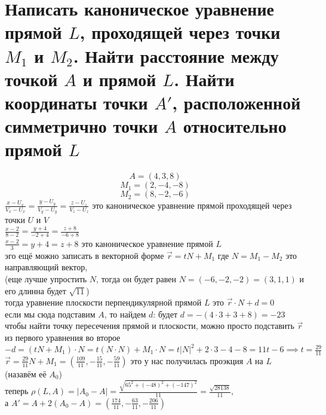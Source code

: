 \documentclass{article}
\renewcommand{\vec}{\overrightarrow}
\newcommand{\ds}{\displaystyle}
\newcommand{\abs}[1]{\left|#1\right|}
\begin{document}
  \section{Написать каноническое уравнение прямой $L$, проходящей через точки $M_1$ и $M_2$. Найти расстояние между точкой $A$ и прямой $L$. Найти координаты точки $A'$, расположенной симметрично точки $A$ относительно прямой $L$}
  $$ A = (4, 3, 8) $$
  $$ M_1 = (2, -4, -8) $$
  $$ M_2 = (8, -2, -6) $$
  $\ds \frac{x-U_x}{V_x-U_x} = \frac{y-U_y}{V_y-U_y} = \frac{z-U_z}{V_z-U_z}$ это каноническое уравнение прямой проходящей через точки $U$ и $V$ \\
  $\ds \frac{x-2}{8-2} = \frac{y+4}{-2+4} = \frac{z+8}{-6+8}$ \\
  $\ds \frac{x-2}{3} = y+4 = z+8$ это каноническое уравнение прямой $L$ \\
  эго ещё можно записать в векторной форме $\ds \vec{r} = tN + M_1$ где $N = M_1-M_2$ это направляющий вектор, \\
  (еще лучше упростить $N$, тогда он будет равен $N = (-6, -2, -2) = (3, 1, 1)$ и его длинна будет $\sqrt{11}$) \\
  тогда уравнение плоскости перпендикулярной прямой $L$ это $\ds \vec{r} \cdot N + d = 0$ \\
  если мы сюда подставим $A$, то найдем $d$: будет $d = -(4 \cdot 3 + 3 + 8) = -23$ \\
  чтобы найти точку пересечения прямой и плоскости, можно просто подставить $\vec{r}$ из первого уравнения во второе \\
  $\ds -d = (tN + M_1) \cdot N = t(N \cdot N) + M_1 \cdot N = t\abs{N}^2 + 2 \cdot 3 - 4 - 8 = 11t-6 \implies t = \frac{29}{11}$ \\
  $\ds \vec{r} = \frac{29}{11}N + M_1 = \left(\frac{109}{11}, -\frac{15}{11}, -\frac{59}{11}\right)$
  это у нас получилась проэкция $A$ на $L$ (назавём её $A_0$) \\
  теперь $\ds \rho(L,A) = \abs{A_0 - A} = \frac{\sqrt{65^2 + (-48)^2 + (-147)^2}}{11} = \frac{\sqrt{28138}}{11}$, \\
  а $\ds A' = A + 2(A_0 - A) = \left(\frac{174}{11}, -\frac{63}{11}, -\frac{206}{11}\right)$
\end{document}
